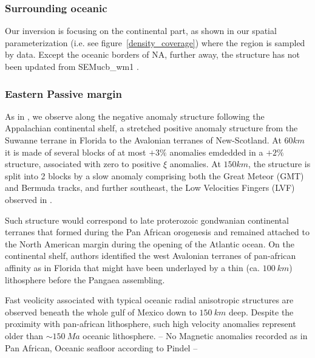 \documentclass[12pt]{article}
\begin{document}


\subsubsection{Surrounding oceanic} 

	Our inversion is focusing on the continental part, as shown in our spatial parameterization (i.e. see figure~\ref{density_coverage}) where the region is sampled by data.
	Except the oceanic borders of NA, further away, the structure has not been updated from SEMucb\_wm1 \citep{french2014whole}. 

	\subsubsection{Eastern Passive margin}
		As in \cite{schaeffer2014imaging,yuan2014lithospheric,james2014rayleigh,silveira2002anisotropic,mocquet1990three}, we observe along the negative anomaly structure following the Appalachian continental shelf, a stretched positive anomaly structure from the Suwanne terrane in Florida to the Avalonian terranes of New-Scotland. 
		At $60km$ it is made of several blocks of at most $+3\%$ anomalies emdedded in a $+2\%$ structure, associated with zero to positive $\xi$ anomalies. At $150km$, the structure is split into 2 blocks by a slow anomaly comprising both the Great Meteor (GMT) and Bermuda tracks, and further southeast, the Low Velocities Fingers (LVF) observed in \cite{french2013waveform}. 

		Such structure would correspond to late proterozoic gondwanian continental terranes that formed during the Pan African orogenesis \citep{kennedy1964structural} and remained attached to the North American margin during the opening of the Atlantic ocean. \citep[e.g.][]{thomas2006tectonic}
		On the continental shelf, authors \citep[e.g.][]{o1983avalon,nance2002cordilleran} identified the west Avalonian terranes of pan-african affinity as in Florida \citep[see][]{smith1982review} that might have been underlayed by a thin (ca. $100 \: km$) lithosphere before the Pangaea assembling. \citep{mckenzie2015lithospheric}

		Fast veolicity associated with typical oceanic radial anisotropic structures are observed beneath the whole gulf of Mexico down to $150 \: km$ deep. Despite the proximity with pan-african lithosphere, such high velocity anomalies represent older than $\sim 150 \: Ma$ oceanic lithosphere. \citep{muller2008age,pindell2009tectonic}
		-- No Magnetic anomalies recorded as in Pan African, Oceanic seafloor according to Pindel --
\end{document}
